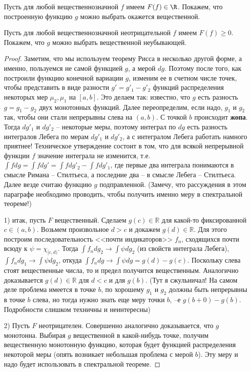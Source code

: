 \documentclass[a4paper]{article}
\begin{document}
\begin{stm}
Пусть для любой вещественнозначной $f$ имеем $F(f)\in\R$. Покажем, что построенную
функцию $g$ можно выбрать окажется вещественной.

Пусть для любой вещественнозначной неотрицательной $f$ имеем $F(f)\ge 0$. Покажем, что $g$
можно выбрать вещественной неубывающей.
\end{stm}
\begin{proof}
Заметим, что мы используем теорему Рисса в несколько другой форме, а именно, пользуемся не самой
функцией $g$, а мерой $dg$. Поэтому после того, как построили функцию конечной вариации $g$,
изменим ее в счетном числе точек, чтобы представить в виде разности $g'=g'_1-g'_2$ функций
распределения некоторых мер $\mu_2,\mu_1$ на $[a,b]$. Это делаем так: известно, что $g$
есть разность $g=g_1-g_2$ двух монотонных функций. Далее переопределим, если надо, $g_1$ и $g_2$
так, чтобы они стали непрерывны слева на $(a,b)$. С точкой $b$ происходит \textbf{жопа}.
Тогда $dg'_1$ и $dg'_2$ -- некоторые меры, поэтому интеграл по $dg$ есть разность интегралов
Лебега по мерам $dg'_1$ и $dg'_2$, а с интегралом Лебега работать намного приятнее!
Техническое утверждение \cite[гл.~6, \S~6, п.~4]{kf} состоит в том, что для всякой непрерывной
функции $f$ значение интеграла не изменится, т.е. $\int fdg=\int fdg'=\int fdg'_2-\int fdg'_1$,
где первые два интеграла понимаются в смысле Римана -- Стилтьеса, а последние два -- в
смысле Лебега -- Стилтьеса. Далее везде считаю функцию $g$ подправленной. (Замечу, что рассуждения
в этом параграфе необходимо проводить, чтобы получить именно меру в спектральной теореме!)

1) итак, пусть $F$ вещественный. Сделаем $g(c)\in\mathbb R$ для какой-то фиксированной
$c\in(a,b)$. Возьмем произвольное $d>c$ и докажем $g(d)\in\mathbb R$. Для этого построим последовательность
<<почти индикаторов>> $f_n$, сходящихся почти всюду к $\psi=\chi_{[c,d)}$. Тогда
$\int f_ndg_2\to\int\psi dg_2$ (из свойств интеграла Лебега), $\int f_ndg_1\to\int\psi dg_2$,
откуда $\int f_ndg\to\int\psi dg=g(d)-g(c)$. Поскольку слева стоят вещественные числа, то и
предел получится вещественным. Аналогично доказывается $g(d)\in\mathbb R$ для $d<c$ и
для $g(b)$. (Тут я сжульничал! На самом деле проблема имеется в точке $b$, по хорошему $g_1$
и $g_2$ должны быть непрерывны в точке $b$ слева, но тогда нужно знать еще меру точки $b$,  --е
$g(b+0)-g(b)$. Подробности слишком техничны и неинтересны)

2) Пусть $F$ неотрицателен. Совершенно аналогично доказывается, что $g$ монотонна. Выбирая $g$
вещественной в какой-нибудь точке, получим вещественную монотонную функцию, которая будет функцией
распределения некоторой меры (опять возникает небольшая проблема с мерой $b$). Эту меру и надо
будет использовать в спектральной теореме.
\end{proof}
\end{document}
